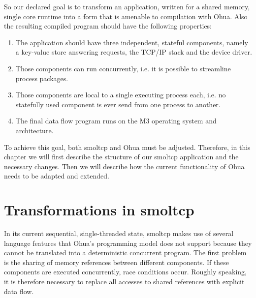 So our declared goal is to transform an application, written for a shared memory, single core runtime into a form that is amenable to compilation with Ohua. Also the resulting compiled program should have the following properties:
\begin{enumerate}
    \item The application should have three independent, stateful components, namely a key-value store answering requests, the TCP/IP stack and the device driver. 
    \item Those components can run concurrently, i.e. it is possible to streamline process packages. 
    \item Those components are local to a single executing process each, i.e. no statefully used component is ever send from one process to another.
    \item The final data flow program runs on the M3 operating system and architecture.
\end{enumerate}

To achieve this goal, both smoltcp and Ohua must be adjusted. Therefore, in this chapter we will first describe the structure of our smoltcp application and the necessary changes. Then we will describe how the current functionality of Ohua needs to be adapted and extended. 

\section{Transformations in smoltcp}
\label{sec:ImplSmoltcp}

In its current sequential, single-threaded state, smoltcp makes use of several language features that Ohua's programming model does not support because they cannot be translated into a deterministic concurrent program. The first problem is the sharing of memory references between different components. If these components are executed concurrently, race conditions occur. Roughly speaking, it is therefore necessary to replace all accesses to shared references with explicit data flow.

